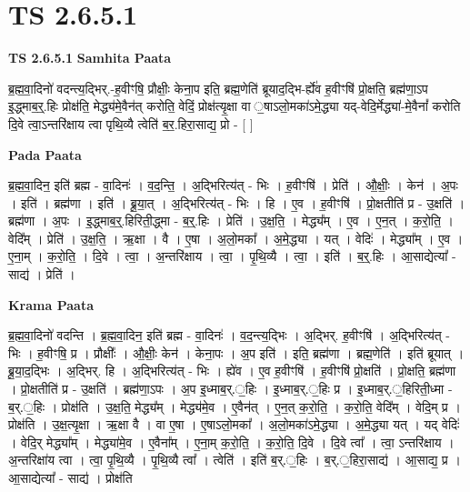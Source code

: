 \documentclass[17pt]{extarticle}
\begin{document}
\section{ TS 2.6.5.1 }

\textbf{TS 2.6.5.1 } \newline
\textbf{Samhita Paata} \newline

ब्र॒ह्म॒वा॒दिनो॑ वदन्त्य॒द्भिर्.-ह॒वीꣳषि॒ प्रौक्षीः॒ केना॒प इति॒ ब्रह्म॒णेति॑ ब्रूयाद॒द्भि-र्ह्ये॑व ह॒वीꣳषि॑ प्रो॒क्षति॒ ब्रह्म॑णा॒ऽप इ॒द्ध्माब॒र्॒.हिः प्रोक्ष॑ति॒ मेद्ध्य॑मे॒वैन॑त् करोति॒ वेदिं॒ प्रोक्ष॑त्यृ॒क्षा वा ॒षाऽलो॒मका॑ऽमे॒द्ध्या यद्-वेदि॒र्मेद्ध्या॑-मे॒वैनां᳚ करोति दि॒वे त्वा॒ऽन्तरि॑क्षाय त्वा पृथि॒व्यै त्वेति॑ ब॒र॒.हिरा॒साद्य॒ प्रो - [  ] \newline

\textbf{Pada Paata} \newline

ब्र॒ह्म॒वा॒दिन॒ इति॑ ब्रह्म - वा॒दिनः॑ । व॒द॒न्ति॒ । अ॒द्भिरित्य॑त् - भिः । ह॒वीꣳषि॑ । प्रेति॑ । औ॒क्षीः॒ । केन॑ । अ॒पः । इति॑ । ब्रह्म॑णा । इति॑ । ब्रू॒या॒त् । अ॒द्भिरित्य॑त् - भिः । हि । ए॒व । ह॒वीꣳषि॑ । प्रो॒क्षतीति॑ प्र - उ॒क्षति॑ । ब्रह्म॑णा । अ॒पः । इ॒द्ध्माब॒र्॒.हिरिती॒द्ध्मा - ब॒र्॒.हिः । प्रेति॑ । उ॒क्ष॒ति॒ । मेद्ध्य᳚म् । ए॒व । ए॒न॒त् । क॒रो॒ति॒ । वेदि᳚म् । प्रेति॑ । उ॒क्ष॒ति॒ । ऋ॒क्षा । वै । ए॒षा । अ॒लो॒मका᳚ । अ॒मे॒द्ध्या । यत् । वेदिः॑ । मेद्ध्या᳚म् । ए॒व । ए॒ना॒म् । क॒रो॒ति॒ । दि॒वे । त्वा॒ । अ॒न्तरि॑क्षाय । त्वा॒ । पृ॒थि॒व्यै । त्वा॒ । इति॑ । ब॒र्॒.हिः । आ॒साद्येत्या᳚ - साद्य॑ । प्रेति॑ ।  \newline


\textbf{Krama Paata} \newline

ब्र॒ह्म॒वा॒दिनो॑ वदन्ति । ब्र॒ह्म॒वा॒दिन॒ इति॑ ब्रह्म - वा॒दिनः॑ । व॒द॒न्त्य॒द्भिः । अ॒द्भिर्. ह॒वीꣳषि॑ । अ॒द्भिरित्य॑त् - भिः । ह॒वीꣳषि॒ प्र । प्रौक्षीः᳚ । औ॒क्षीः॒ केन॑ । केना॒पः । अ॒प इति॑ । इति॒ ब्रह्म॑णा । ब्रह्म॒णेति॑ । इति॑ ब्रूयात् । ब्रू॒या॒द॒द्भिः । अ॒द्भिर्. हि । अ॒द्भिरित्य॑त् - भिः । ह्ये॑व । ए॒व ह॒वीꣳषि॑ । ह॒वीꣳषि॑ प्रो॒क्षति॑ । प्रो॒क्षति॒ ब्रह्म॑णा । प्रो॒क्षतीति॑ प्र - उ॒क्षति॑ । ब्रह्म॑णा॒ऽपः । अ॒प इ॒ध्माब॒र्.॒हिः । इ॒ध्माब॒र्.॒हिः प्र । इ॒ध्माब॒र्.॒हिरिती॒ध्मा - ब॒र्.॒हिः । प्रोक्ष॑ति । उ॒क्ष॒ति॒ मेद्ध्य᳚म् । मेद्ध्य॑मे॒व । ए॒वैन॑त् । ए॒न॒त् क॒रो॒ति॒ । क॒रो॒ति॒ वेदि᳚म् । वेदि॒म् प्र । प्रोक्ष॑ति । उ॒क्ष॒त्यृ॒क्षा । ऋ॒क्षा वै । वा ए॒षा । ए॒षाऽलो॒मका᳚ । अ॒लो॒मका॑ऽमे॒द्ध्या । अ॒मे॒द्ध्या यत् । यद् वेदिः॑ । वेदि॒र् मेद्ध्या᳚म् । मेद्ध्या॑मे॒व । ए॒वैना᳚म् । ए॒ना॒म् क॒रो॒ति॒ । क॒रो॒ति॒ दि॒वे । दि॒वे त्वा᳚ । त्वा॒ ऽन्तरि॑क्षाय । अ॒न्तरिक्षा॑य त्वा । त्वा॒ पृ॒थि॒व्यै । पृ॒थि॒व्यै त्वा᳚ । त्वेति॑ । इति॑ ब॒र्.॒हिः । ब॒र्.॒हिरा॒साद्य॑ । आ॒साद्य॒ प्र । आ॒साद्येत्या᳚ - साद्य॑ । प्रोक्ष॑ति \newline
\end{document}
